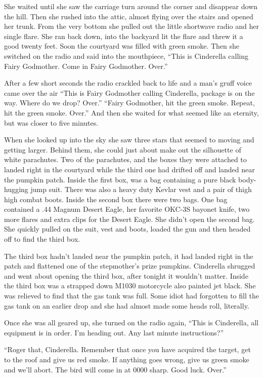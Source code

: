 \documentclass[11pt,letterpaper]{article}
\begin{document}
She waited until she saw the carriage turn around the corner and disappear down the hill. Then she rushed into the attic, almost flying over the stairs and opened her trunk. From the very bottom she pulled out the little shortwave radio and her single flare. She ran back down, into the backyard lit the flare and threw it a good twenty feet. Soon the courtyard was filled with green smoke. Then she switched on the radio and said into the mouthpiece, ``This is Cinderella calling Fairy Godmother. Come in Fairy Godmother. Over.''

After a few short seconds the radio crackled back to life and a man's gruff voice came over the air ``This is Fairy Godmother calling Cinderella, package is on the way. Where do we drop? Over.'' ``Fairy Godmother, hit the green smoke. Repeat, hit the green smoke. Over.'' And then she waited for what seemed like an eternity, but was closer to five minutes.

When she looked up into the sky she saw three stars that seemed to moving and getting larger. Behind them, she could just about make out the silhouette of white parachutes. Two of the parachutes, and the boxes they were attached to landed right in the courtyard while the third one had drifted off and landed near the pumpkin patch. Inside the first box, was a bag containing a pure black body-hugging jump suit. There was also a heavy duty Kevlar vest and a pair of thigh high combat boots. Inside the second box there were two bags. One bag contained a .44 Magnum Desert Eagle, her favorite OKC-3S bayonet knife, two more flares and extra clips for the Desert Eagle. She didn't open the second bag. She quickly pulled on the suit, vest and boots, loaded the gun and then headed off to find the third box.

The third box hadn't landed near the pumpkin patch, it had landed right in the patch and flattened one of the stepmother's prize pumpkins. Cinderella shrugged and went about opening the third box, after tonight it wouldn't matter. Inside the third box was a strapped down M1030 motorcycle also painted jet black. She was relieved to find that the gas tank was full. Some idiot had forgotten to fill the gas tank on an earlier drop and she had almost made some heads roll, literally.

Once she was all geared up, she turned on the radio again, ``This is Cinderella, all equipment is in order. I'm heading out. Any last minute instructions?''

``Roger that, Cinderella. Remember that once you have acquired the target, get to the roof and give us red smoke. If anything goes wrong, give us green smoke and we'll abort. The bird will come in at 0000 sharp. Good luck. Over.''
\end{document}
